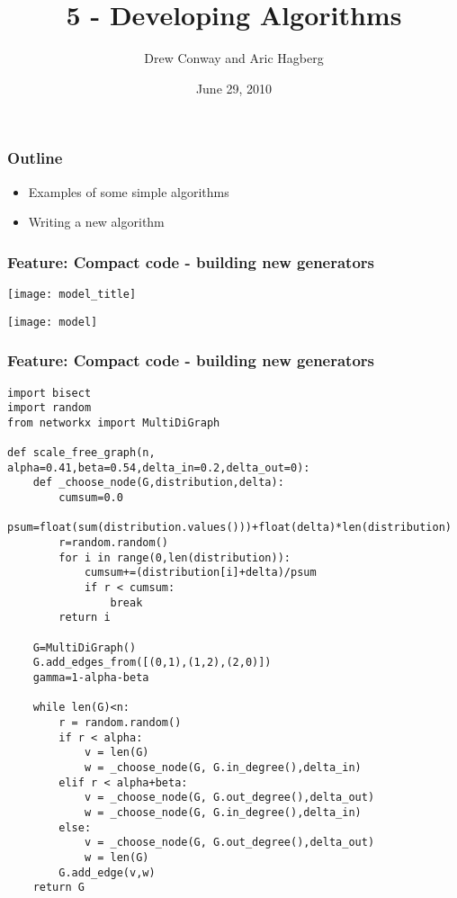 \documentclass[xcolor=dvipsnames, 9pt]{beamer}
\title{5 - Developing Algorithms}
\author{Drew Conway and Aric Hagberg}
\date{June 29, 2010}
\begin{document}
\begin{frame}[plain]
\titlepage
\end{frame}

\begin{frame}
\frametitle{Outline}
\begin{itemize}
\item Examples of some simple algorithms
\item Writing a new algorithm
\end{itemize}
\end{frame}

\begin{frame}[fragile]
\frametitle{Feature: Compact code - building new generators}
\centerline{\texttt{[image: model\_title]}}
\centerline{\texttt{[image: model]}}
\end{frame}


\begin{frame}[fragile]
\frametitle{Feature: Compact code - building new generators}
\begin{block}{}
\tiny
\begin{lstlisting}
import bisect
import random
from networkx import MultiDiGraph

def scale_free_graph(n, alpha=0.41,beta=0.54,delta_in=0.2,delta_out=0):
    def _choose_node(G,distribution,delta):
        cumsum=0.0
        psum=float(sum(distribution.values()))+float(delta)*len(distribution)
        r=random.random()
        for i in range(0,len(distribution)):
            cumsum+=(distribution[i]+delta)/psum
            if r < cumsum:  
                break
        return i

    G=MultiDiGraph()
    G.add_edges_from([(0,1),(1,2),(2,0)])
    gamma=1-alpha-beta

    while len(G)<n:
        r = random.random()
        if r < alpha:
            v = len(G) 
            w = _choose_node(G, G.in_degree(),delta_in)
        elif r < alpha+beta:
            v = _choose_node(G, G.out_degree(),delta_out)
            w = _choose_node(G, G.in_degree(),delta_in)
        else:
            v = _choose_node(G, G.out_degree(),delta_out)
            w = len(G) 
        G.add_edge(v,w)
    return G

\end{lstlisting}
\end{block}
\end{frame}
\end{document}
